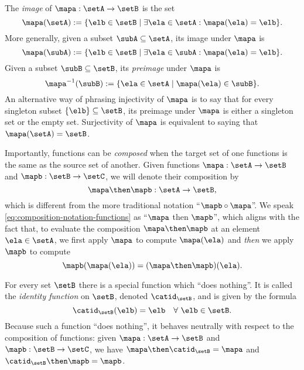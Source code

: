 The \emph{image} of $\mapa: \setA \to \setB$ is the set
\begin{equation}
\mapa(\setA) := \{ \elb \in \setB \mid \exists \ela \in \setA : \mapa(\ela) = \elb \}. 
\end{equation}
More generally, given a subset $\subA \subseteq \setA$, its image under $\mapa$ is
\begin{equation}
\mapa(\subA) := \{ \elb \in \setB \mid \exists \ela \in \subA : \mapa(\ela) = \elb \}. 
\end{equation}
Given a subset $\subB \subseteq \setB$, its \emph{preimage} under $\mapa$ is
\begin{equation}
\mapa^{-1}(\subB) :=\{ \ela \in \setA \mid  \mapa(\ela) \in \subB \}. 
\end{equation}
An alternative way of phrasing injectivity of $\mapa$ is to say that for every singleton subset $\{ \elb \} \subseteq \setB$, its preimage under $\mapa$ is either a singleton set or the empty set. Surjectivity of $\mapa$ is equivalent to saying that $\mapa(\setA) = \setB$. 

Importantly, functions can be \emph{composed} when the target set of one functions is the same as the source set of another. Given functions $\mapa: \setA \to \setB$ and $\mapb : \setB \to \setC$, we will denote their composition by
\begin{equation}\label{eq:composition-notation-functions}
\mapa \then \mapb : \setA \to \setB,
\end{equation}
which is different from the more traditional notation ``$\mapb \circ \mapa$''. We speak \cref{eq:composition-notation-functions} as ``$\mapa$ then $\mapb$'', which aligns with the fact that, to evaluate the composition $\mapa \then \mapb$ at an element $\ela \in \setA$, we first apply $\mapa$ to compute $\mapa(\ela)$ and \emph{then} we apply $\mapb$ to compute
$$\mapb(\mapa(\ela))=(\mapa \then \mapb)(\ela).$$ 

For every set $\setB$ there is a special function which ``does nothing''. It is called the \emph{identity function} on $\setB$, denoted $\catid_\setB$, and is given by the formula 
\begin{equation}
\catid_\setB(\elb) = \elb \quad \forall \ \elb \in \setB.
\end{equation}
Because such a function ``does nothing'', it behaves neutrally with respect to the composition of functions: given $\mapa : \setA \to \setB$ and $\mapb : \setB \to \setC$, we have $\mapa \then \catid_\setB = \mapa$ and $\catid_\setB \then \mapb = \mapb$. 

